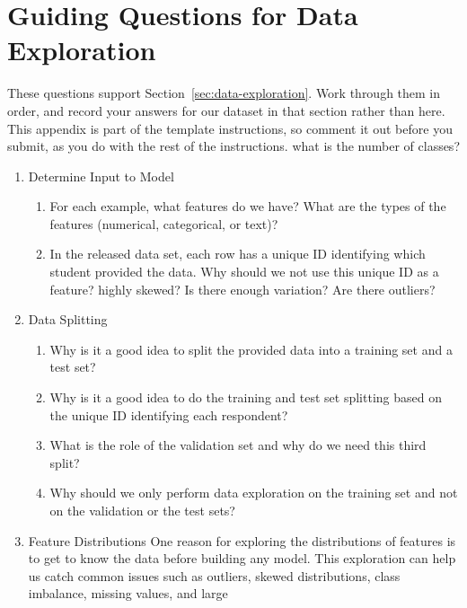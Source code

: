 \documentclass[12pt]{article}
\begin{document}
\section{Guiding Questions for Data Exploration}\label{app:data-exploration}
These questions support Section~\ref{sec:data-exploration}. Work through them in
order, and record your answers for our dataset in that section rather than here.
This appendix is part of the template instructions, so comment it out before you
submit, as you do with the rest of the instructions.
%
%
what is the number of classes?
%
\begin{enumerate}
\item Determine Input to Model
\begin{enumerate}
\item For each example, what features do we have? What are the types of the
features (numerical, categorical, or text)?
\item In the released data set, each row has a unique ID identifying which student
provided the data. Why should we not use this unique ID as a feature?
highly skewed? Is there enough variation? Are there outliers?
\end{enumerate}
\item Data Splitting
\begin{enumerate}
\item Why is it a good idea to split the provided data into a training set and a
test set?
\item Why is it a good idea to do the training and test set splitting based on the
unique ID identifying each respondent?
\item What is the role of the validation set and why do we need this third split?
\item Why should we only perform data exploration on the training set and not on
the validation or the test sets?
\end{enumerate}
\item Feature Distributions
\smallskip
One reason for exploring the distributions of features is to get to know the data
before building any model. This exploration can help us catch common issues such as
outliers, skewed distributions, class imbalance, missing values, and large

\end{enumerate}
\end{document}
